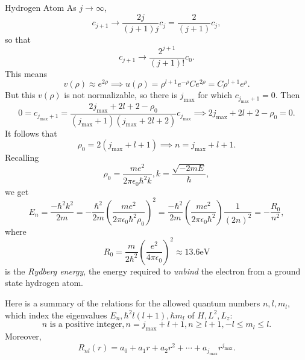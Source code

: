 \documentclass[phys334]{subfiles}
\begin{document}
\begin{example}{Hydrogen Atom}
        As $j\to\infty$,
        \begin{equation*}
            c_{j+1} \to \frac{2j}{\left( j+1 \right)j}c_j = \frac{2}{\left( j+1 \right)}c_j,
        \end{equation*}
        so that
        \begin{equation*}
            c_{j+1} \to \frac{2^{j+1}}{\left( j+1 \right)!}c_0.
        \end{equation*}
        This means
        \begin{equation*}
            v\left( \rho \right) \approx e^{2\rho} \implies u\left( \rho \right) = \rho^{l+1}e^{-\rho}Ce^{2\rho} = C\rho^{l+1}e^{\rho}.
        \end{equation*}
        But this $v\left( \rho \right)$ is not normalizable, so there is $j_{\text{max}}$ for which $c_{j_{\text{max}}+1} = 0$. Then
        \begin{equation*}
            0 = c_{j_{\text{max}}+1} = \frac{2j_{\text{max}}+2l+2-\rho_0}{\left( j_{\max}+1 \right)\left( j_{\max}+2l+2 \right)}c_{j_{\max}} \implies 2j_{\max}+2l+2-\rho_0 = 0.
        \end{equation*}
        It follows that
        \begin{equation*}
            \rho_0 = 2\left( j_{\max}+l+1 \right) \implies n = j_{\max}+l+1.
        \end{equation*}
        Recalling
        \begin{equation*}
            \rho_0 = \frac{me^{2}}{2\pi\epsilon_0\hbar^{2}k}, k = \frac{\sqrt{-2mE}}{\hbar},
        \end{equation*}
        we get
        \begin{equation*}
            E_n = \frac{-\hbar^{2}k^{2}}{2m} = -\frac{\hbar^{2}}{2m}\left( \frac{me^{2}}{2\pi\epsilon_0\hbar^{2}\rho_0} \right)^{2} = \frac{-\hbar^{2}}{2m}\left( \frac{me^{2}}{2\pi\epsilon_0\hbar^{2}} \right)\frac{1}{\left( 2n \right)^{2}} = -\frac{R_0}{n^{2}},
        \end{equation*}
        where
        \begin{equation*}
            R_0 = \frac{m}{2\hbar^{2}} \left( \frac{e^{2}}{4\pi\epsilon_0} \right)^{2} \approx 13.6\text{eV}
        \end{equation*}
        is the \textit{Rydberg energy}, the energy required to \textit{unbind} the electron from a ground state hydrogen atom.

        Here is a summary of the relations for the allowed quantum numbers $n,l,m_l$, which index the eigenvalues $E_n, \hbar^{2}l\left( l+1 \right), \hbar m_l$ of $H,L^{2},L_z$:
        \begin{equation*}
            n\text{ is a positive integer}, n=j_{\max}+l+1, n\geq l+1, -l\leq m_l\leq l.
        \end{equation*}
        Moreover,
        \begin{equation*}
            R_{nl}\left( r \right) = a_0 + a_1r + a_2r^2 + \cdots + a_{j_{\max}}r^{j_{\max}}.
        \end{equation*}
    \end{example}
\end{document}
